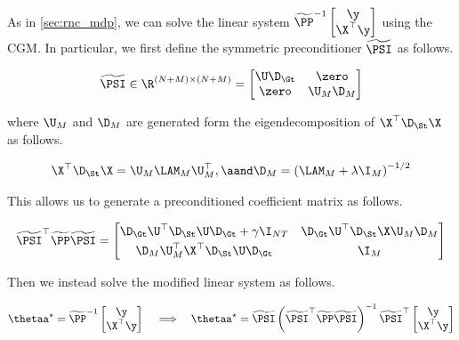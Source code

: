 As in \cref{sec:rnc_mdp}, we can solve the linear system $\widetilde{\PP}^{-1}\begin{bmatrix} \y \\ \X^\top \y \end{bmatrix}$ using the CGM. In particular, we first define the symmetric preconditioner $\widetilde{\PSI}$ as follows. 

\begin{equation}
    \widetilde{\PSI} \in \R^{(N + M) \times (N + M)} = \begin{bmatrix}
        \U \D_\Gt & \zero \\
        \zero & \U_M \D_M 
    \end{bmatrix}
\end{equation}

where $\U_M$ and $\D_M$ are generated form the eigendecomposition of $\X^\top \D_\St \X$ as follows. 

\begin{equation}
    \X^\top \D_\St \X = \U_M \LAM_M \U_M^\top, \aand \D_M = \left(\LAM_M + \lambda \I_M\right)^{-1/2}
\end{equation}

This allows us to generate a preconditioned coefficient matrix as follows.  

\begin{equation*}
    \widetilde{\PSI}^\top \widetilde{\PP}  \widetilde{\PSI} = 
       \begin{bmatrix}
        \D_\Gt \U^\top \D_\St \U \D_\Gt + \gamma \I_{NT}  &  \D_\Gt \U^\top \D_\St \X \U_M \D_M \\[0.1cm] 
        \D_M \U_M^\top \X^\top \D_\St \U \D_\Gt & \I_M
        \end{bmatrix}
\end{equation*}

Then we instead solve the modified linear system as follows.

\begin{equation*}
    \thetaa^\star = \widetilde{\PP}^{-1}\begin{bmatrix} \y \\ \X^\top \y \end{bmatrix}\, \quad \Longrightarrow \quad  \thetaa^\star = \widetilde{\PSI} \left(\widetilde{\PSI}^\top \widetilde{\PP}  \widetilde{\PSI} \right)^{-1}\widetilde{\PSI}^\top \begin{bmatrix} \y \\ \X^\top \y \end{bmatrix}
\end{equation*}


